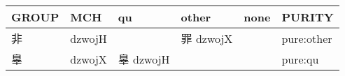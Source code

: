 \documentclass[14pt,a4paper]{scrartcl}
\begin{document}
\begin{longtable}[c]{@{}llllll@{}}
\toprule
\begin{minipage}[b]{0.14\columnwidth}\raggedright\strut
GROUP
\strut\end{minipage} &
\begin{minipage}[b]{0.14\columnwidth}\raggedright\strut
MCH
\strut\end{minipage} &
\begin{minipage}[b]{0.14\columnwidth}\raggedright\strut
qu
\strut\end{minipage} &
\begin{minipage}[b]{0.14\columnwidth}\raggedright\strut
other
\strut\end{minipage} &
\begin{minipage}[b]{0.14\columnwidth}\raggedright\strut
none
\strut\end{minipage} &
\begin{minipage}[b]{0.14\columnwidth}\raggedright\strut
PURITY
\strut\end{minipage}\tabularnewline
\midrule
\endhead
\begin{minipage}[t]{0.14\columnwidth}\raggedright\strut
非
\strut\end{minipage} &
\begin{minipage}[t]{0.14\columnwidth}\raggedright\strut
dzwojH
\strut\end{minipage} &
\begin{minipage}[t]{0.14\columnwidth}\raggedright\strut
\strut\end{minipage} &
\begin{minipage}[t]{0.14\columnwidth}\raggedright\strut
罪 dzwojX
\strut\end{minipage} &
\begin{minipage}[t]{0.14\columnwidth}\raggedright\strut
\strut\end{minipage} &
\begin{minipage}[t]{0.14\columnwidth}\raggedright\strut
pure:other
\strut\end{minipage}\tabularnewline
\begin{minipage}[t]{0.14\columnwidth}\raggedright\strut
辠
\strut\end{minipage} &
\begin{minipage}[t]{0.14\columnwidth}\raggedright\strut
dzwojX
\strut\end{minipage} &
\begin{minipage}[t]{0.14\columnwidth}\raggedright\strut
辠 dzwojH
\strut\end{minipage} &
\begin{minipage}[t]{0.14\columnwidth}\raggedright\strut
\strut\end{minipage} &
\begin{minipage}[t]{0.14\columnwidth}\raggedright\strut
\strut\end{minipage} &
\begin{minipage}[t]{0.14\columnwidth}\raggedright\strut
pure:qu
\strut\end{minipage}\tabularnewline
\bottomrule
\end{longtable}
\end{document}
